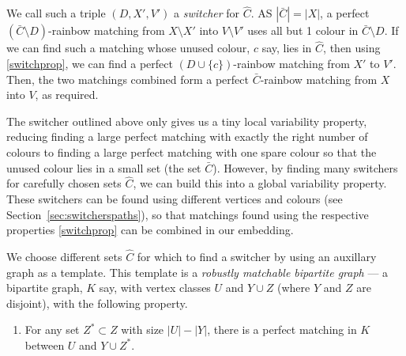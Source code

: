 We call such a triple $(D,X',V')$ a \emph{switcher} for $\hat{C}$. AS $|\bar{C}|=|X|$, a perfect $(\bar{C}\setminus D)$-rainbow matching from $X\setminus X'$ into $V\setminus V'$ uses all but 1 colour in $\bar{C}\setminus D$. If we can find such a matching whose unused colour, $c$ say, lies in $\hat{C}$, then using \ref{switchprop}, we can find a perfect $(D\cup\{c\})$-rainbow matching from $X'$ to $V'$. Then, the two matchings combined form a perfect $\bar{C}$-rainbow matching from $X$ into $V$, as required.

The switcher outlined above only gives us a tiny local variability property, reducing finding a large perfect matching with exactly the right number of colours to finding a large perfect matching with one spare colour so that the unused colour lies in a small set (the set $\bar{C}$). However, by finding many switchers for carefully chosen sets $\hat{C}$, we can build this into a global variability property. These switchers can be found using different vertices and colours (see Section~\ref{sec:switcherspaths}), so that matchings found using the respective properties \ref{switchprop} can be combined in our embedding. 

We choose different sets $\hat{C}$ for which to find a switcher by using an auxillary graph as a template. This template is a \emph{robustly matchable bipartite graph} --- a bipartite graph, $K$ say, with vertex classes $U$ and $Y\cup Z$ (where $Y$ and $Z$ are disjoint), with the following property.

\begin{enumerate}[label = {\bfseries \Alph{propcounter}\arabic{enumi}}]\addtocounter{enumi}{1}
\item For any set $Z^\ast\subset Z$ with size $|U|-|Y|$, there is a perfect matching in $K$ between $U$ and $Y\cup Z^\ast$.
\end{enumerate}

